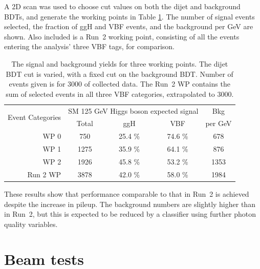 A 2D scan was used to choose cut values on both the dijet and background BDTs, and generate the working points in Table \ref{tab:hgcal_yields}.
The number of signal events selected, the fraction of ggH and VBF events, and the background per GeV are shown.
Also included is a Run~2 working point, consisting of all the events entering the analysis' three VBF tags, for comparison.

\begin{table}
  \centering
  \begin{tabular}{ r | c |  c |  c |  c }
  \multirow{2}{*}{Event Categories} &\multicolumn{3}{c|}{SM 125 GeV Higgs boson expected signal} & Bkg \\
    &  Total & ggH & VBF & per GeV \\
  \hline
  WP 0 &    750   &  25.4 \%  &  74.6 \%  &  678  \\
  WP 1 &    1275  &  35.9 \%  &  64.1 \%  &  876  \\
  WP 2 &    1926  &  45.8 \%  &  53.2 \%  &  1353 \\
  Run 2 WP &    3878 &  42.0 \%  &  58.0 \%  &  1984 \\
  \end{tabular}
  \caption{The signal and background yields for three working points.
  The dijet BDT cut is varied, with a fixed cut on the background BDT.
  Number of events given is for \SI{3000}{\fbinv} of collected data. 
  The Run~2 WP contains the sum of selected events in all three VBF categories, extrapolated to \SI{3000}{\fbinv}.}
  \label{tab:hgcal_yields}
\end{table}

These results show that performance comparable to that in Run~2 is achieved despite the increase in pileup.
The background numbers are slightly higher than in Run~2, but this is expected to be reduced by a classifier using further photon quality variables.

\section{Beam tests}

